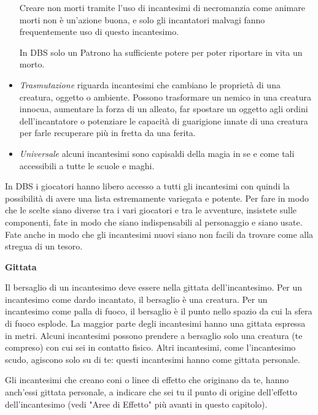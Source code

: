 \begin{multicols}{2}
\begin{itemize}
Creare non morti tramite l'uso di incantesimi di necromanzia come animare morti non è un'azione buona, e solo gli incantatori malvagi fanno frequentemente uso di questo incantesimo.

In DBS solo un Patrono ha sufficiente potere per poter riportare in vita un morto.

\item
\textit{Trasmutazione} riguarda incantesimi che cambiano le proprietà di una creatura, oggetto o ambiente. Possono trasformare un nemico in una creatura innocua, aumentare la forza di un alleato, far spostare un oggetto agli ordini dell'incantatore o potenziare le capacità di guarigione innate di una creatura per farle recuperare più in fretta da una ferita.

\item
\textit{Universale} alcuni incantesimi sono capisaldi della magia in se e come tali accessibili a tutte le scuole e maghi.

\end{itemize}

\begin{narratore}{In DBS i giocatori hanno libero accesso a tutti gli incantesimi con quindi la possibilità di avere una lista estremamente variegata e potente. Per fare in modo che le scelte siano diverse tra i vari giocatori e tra le avventure, insistete sulle componenti, fate in modo che siano indispensabili al personaggio e siano usate. Fate anche in modo che gli incantesimi nuovi siano non facili da trovare come alla stregua di un tesoro.
}\end{narratore}


\medskip

\textbf{Gittata}

Il bersaglio di un incantesimo deve essere nella gittata dell'incantesimo. Per un incantesimo come dardo incantato, il bersaglio è una creatura. Per un incantesimo come palla di fuoco, il bersaglio è il punto nello spazio da cui la sfera di fuoco esplode. La maggior parte degli incantesimi hanno una gittata espressa in metri. Alcuni incantesimi possono prendere a bersaglio solo una creatura (te compreso) con cui sei in contatto fisico. Altri incantesimi, come l'incantesimo scudo, agiscono solo su di te: questi incantesimi hanno come gittata personale.

Gli incantesimi che creano coni o linee di effetto che originano da te, hanno anch'essi gittata personale, a indicare che sei tu il punto di origine dell'effetto dell'incantesimo (vedi "Aree di Effetto" più avanti in questo capitolo).


\end{multicols}
